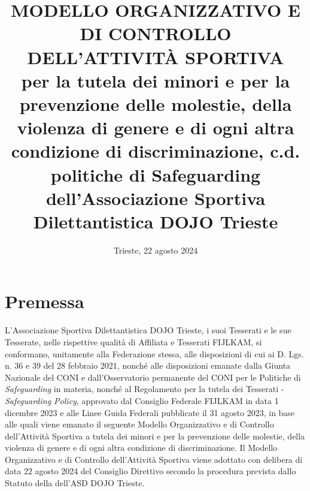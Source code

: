 \documentclass{djtsasddoc}
\title{MODELLO ORGANIZZATIVO E DI CONTROLLO DELL'ATTIVITÀ SPORTIVA \\[10pt] {\normalfont\large per la tutela dei minori e per la prevenzione delle molestie, della violenza di genere e di ogni altra condizione di discriminazione, c.d. politiche di Safeguarding dell'Associazione Sportiva Dilettantistica DOJO Trieste}}
\date{Trieste, 22 agosto 2024}
\begin{document}
	\maketitle
	
	\section*{Premessa}
	L'Associazione Sportiva Dilettantistica DOJO Trieste, i suoi Tesserati e le sue Tesserate, nelle rispettive qualità di Affiliata e Tesserati FIJLKAM, si conformano, unitamente alla Federazione stessa, alle disposizioni di cui ai D. Lgs. n. 36 e 39 del 28 febbraio 2021, nonché alle disposizioni emanate dalla Giunta Nazionale del CONI e dall'Osservatorio permanente del CONI per le Politiche di \textit{Safeguarding} in materia, nonché al Regolamento per la tutela dei Tesserati - \textit{Safeguarding Policy}, approvato dal Consiglio Federale FIJLKAM in data 1 dicembre 2023 e alle Linee Guida Federali pubblicate il 31 agosto 2023, in base alle quali viene emanato il seguente Modello Organizzativo e di Controllo dell'Attività Sportiva  a tutela dei minori  e per la prevenzione delle molestie, della violenza di genere e di ogni altra condizione di discriminazione.
	Il Modello Organizzativo e di Controllo dell'Attività Sportiva viene adottato con delibera di data 22 agosto 2024 del Consiglio Direttivo secondo la procedura prevista dallo Statuto della dell'ASD DOJO Trieste.
	
\end{document}
